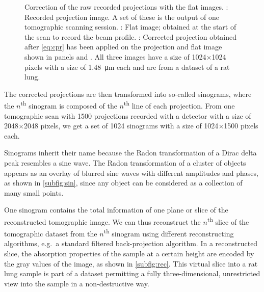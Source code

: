 \begin{figure}
{%
		\label{subfig:cpr}%
		}%
	\caption[Correction of the projections with flat images]{Correction of the raw recorded projections with the flat images. : Recorded projection image. A set of these is the output of one tomographic scanning session. : Flat image; obtained at the start of the scan to record the beam profile. : Corrected projection obtained after \autoref{eq:cpr} has been applied on the projection and flat image shown in panels  and . All three images have a size of 1024$\times$1024 pixels with a size of \SI{1.48}{\micro\meter} each and are from a dataset of a rat lung.}
	\label{fig:corrected projection}
\end{figure}

The corrected projections are then transformed into so-called sinograms, where the $n$\textsuperscript{th} sinogram is composed of the $n$\textsuperscript{th} line of each projection. From one tomographic scan with 1500 projections recorded with a detector with a size of 2048$\times$2048 pixels, we get a set of 1024 sinograms with a size of 1024$\times$1500 pixels each.

Sinograms inherit their name because the Radon transformation of a Dirac delta peak resembles a sine wave. The Radon transformation of a cluster of objects appears as an overlay of blurred sine waves with different amplitudes and phases, as shown in \autoref{subfig:sin}, since any object can be considered as a collection of many small points.

One sinogram contains the total information of one plane or slice of the reconstructed tomographic image. We can thus reconstruct the $n$\textsuperscript{th} slice of the tomographic dataset from the $n$\textsuperscript{th} sinogram using different reconstructing algorithms, e.g.\ a standard filtered back-projection algorithm. In a reconstructed slice, the absorption properties of the sample at a certain height are encoded by the gray values of the image, as shown in \autoref{subfig:rec}. This virtual slice into a rat lung sample is part of a dataset permitting a fully three-dimensional, unrestricted view into the sample in a non-destructive way.

